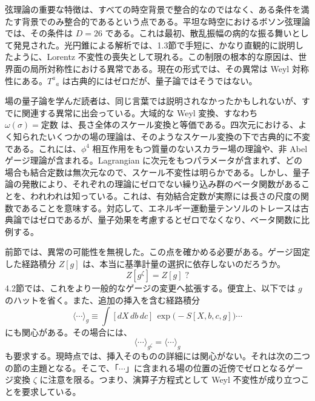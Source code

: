 \label{sec:3.4}

弦理論の重要な特徴は、すべての時空背景で整合的なのではなく、ある条件を満たす背景でのみ整合的であるという点である。平坦な時空におけるボソン弦理論では、その条件は $D=26$ である。これは最初、散乱振幅の病的な振る舞いとして発見された。光円錐による解析では、1.3節で手短に、かなり直観的に説明したように、Lorentz 不変性の喪失として現れる。この制限の根本的な原因は、世界面の局所対称性における異常である。現在の形式では、その異常は Weyl 対称性にある。$T^a{}_a$ は古典的にはゼロだが、量子論ではそうではない。

場の量子論を学んだ読者は、同じ言葉では説明されなかったかもしれないが、すでに関連する異常に出会っている。大域的な Weyl 変換、すなわち $\omega(\sigma)=\text{定数}$ は、長さ全体のスケール変換と等価である。四次元における、よく知られたいくつかの場の理論は、そのようなスケール変換の下で古典的に不変である。これには、$\phi^4$ 相互作用をもつ質量のないスカラー場の理論や、非 Abel ゲージ理論が含まれる。Lagrangian に次元をもつパラメータが含まれず、どの場合も結合定数は無次元なので、スケール不変性は明らかである。しかし、量子論の発散により、それぞれの理論にゼロでない繰り込み群のベータ関数があることを、われわれは知っている。これは、有効結合定数が実際には長さの尺度の関数であることを意味する。対応して、エネルギー運動量テンソルのトレースは古典論ではゼロであるが、量子効果を考慮するとゼロでなくなり、ベータ関数に比例する。

前節では、異常の可能性を無視した。この点を確かめる必要がある。ゲージ固定した経路積分 $Z[g]$ は、本当に基準計量の選択に依存しないのだろうか。
\begin{equation}
Z[g^\zeta]=Z[g]\;?
\tag{3.4.1}\label{eq:3.4.1}
\end{equation}
4.2節では、これをより一般的なゲージの変更へ拡張する。便宜上、以下では $g$ のハットを省く。また、追加の挿入を含む経路積分
\begin{equation}
\langle\cdots\rangle_g
\equiv\int[dX\,db\,dc]\,\exp\bigl(-S[X,b,c,g]\bigr)\cdots
\tag{3.4.2}\label{eq:3.4.2}
\end{equation}
にも関心がある。その場合には、
\begin{equation}
\langle\cdots\rangle_{g^\zeta}=\langle\cdots\rangle_g
\tag{3.4.3}\label{eq:3.4.3}
\end{equation}
も要求する。現時点では、挿入そのものの詳細には関心がない。それは次の二つの節の主題となる。そこで、「$\cdots$」に含まれる場の位置の近傍でゼロとなるゲージ変換 $\zeta$ に注意を限る。つまり、演算子方程式として Weyl 不変性が成り立つことを要求している。


